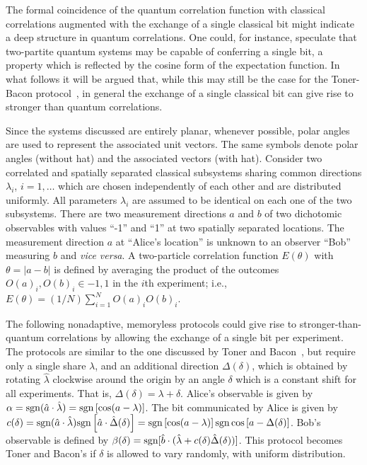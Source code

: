 \documentclass[prl,preprint,amsfonts,showpacs,showkeys]{revtex4}
\begin{document}
The formal coincidence of the quantum correlation function with classical
correlations augmented with the exchange of a single classical bit might indicate a deep structure
in quantum correlations.
One could, for instance, speculate that two-partite quantum systems may be capable of
conferring a single bit, a property which is reflected by the cosine form of the expectation function.
In what follows it will be argued that, while this may still be the case for the Toner-Bacon
protocol~\cite{toner-bacon-03}, in general the exchange of a single classical bit can give rise to
stronger than quantum correlations.



Since the systems discussed are entirely planar, whenever possible,
polar angles are used to represent the associated unit vectors.
The same symbols denote polar angles (without hat)
and the associated vectors (with hat).
Consider two correlated and spatially separated classical subsystems
sharing common
directions $ { \lambda }_i$, $i=1,\ldots$
which are chosen independently of each other and
 are distributed uniformly.
All parameters $ {\lambda }_i$ are assumed to be identical on each one of the two subsystems.
There are two measurement directions ${ a}$ and ${ b}$
of two
dichotomic observables with values ``-1'' and ``1''
at two spatially separated locations.
The measurement direction ${a}$ at ``Alice's location''
is unknown to an observer ``Bob'' measuring ${ b}$ and {\it vice versa}.
A two-particle correlation function $E(\theta )$
with $\theta =\vert {a} - { b}\vert $
is defined by averaging the product of the outcomes $O({ a})_i, O({ b} )_i\in {-1,1}$
in the $i$th experiment; i.e.,  $E(\theta )=(1/N)\sum_{i=1}^N O({ a})_i O({ b})_i$.



The following nonadaptive, memoryless protocols
could give rise to stronger-than-quantum correlations
by allowing the exchange of a single bit per experiment.
The protocols are similar to the one discussed by
Toner and Bacon~\cite{toner-bacon-03}, but require only a single share ${ \lambda }$,
and an additional direction ${ \Delta} (\delta )$, which is obtained by rotating
${\hat \lambda }$ clockwise around the origin by an angle $\delta$ which is a constant
shift for all experiments.
That is, ${\Delta} (\delta )=\lambda +\delta$.
Alice's observable is given by
$\alpha  = {\rm sgn}({\hat a} \cdot {\hat \lambda } )
={\rm sgn}\left[\cos ({a} - { \lambda } )\right]$.
The bit communicated by Alice is given by
$
c(\delta) =
{\rm sgn}({\hat a} \cdot {\hat \lambda } )
{\rm sgn}\left[{\hat a} \cdot {\hat \Delta} (\delta)\right]=
{\rm sgn}\left[\cos ({ a} - { \lambda } )\right]
{\rm sgn}\cos \left[{ a} - { \Delta} (\delta)\right]
$.
Bob's observable is  defined by
$\beta (\delta )=  {\rm sgn}[{\hat b} \cdot ({\hat \lambda } +c(\delta){\hat \Delta} (\delta))]$.
This protocol becomes Toner and Bacon's if $\delta$
is allowed to vary randomly, with uniform distribution.
\end{document}
